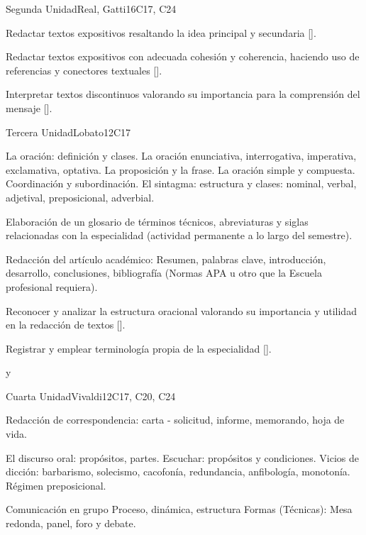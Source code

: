 \begin{syllabus}
\begin{unit}{}{Segunda Unidad}{Real, Gatti}{16}{C17, C24}
\begin{learningoutcomes}
   \item Redactar textos expositivos resaltando la idea principal y secundaria [\Usage].
   \item Redactar textos expositivos con adecuada cohesión y coherencia, haciendo uso de referencias y conectores textuales [\Usage].
   \item Interpretar textos discontinuos  valorando su importancia para la comprensión del mensaje [\Usage].
\end{learningoutcomes}
\end{unit}

\begin{unit}{}{Tercera Unidad}{Lobato}{12}{C17}
\begin{topics}
   \item La oración: definición y clases. La oración enunciativa, interrogativa, imperativa, exclamativa, optativa. La proposición y la frase. La oración simple y compuesta. Coordinación y subordinación. El sintagma: estructura y clases: nominal, verbal, adjetival, preposicional, adverbial.
   \item Elaboración de un glosario de términos técnicos, abreviaturas y siglas relacionadas con la especialidad (actividad permanente a lo largo del semestre).
   \item Redacción del artículo académico: Resumen, palabras clave, introducción, desarrollo, conclusiones, bibliografía (Normas APA u otro que la Escuela profesional requiera).
\end{topics}
\begin{learningoutcomes}
   \item Reconocer y analizar  la estructura oracional valorando su importancia y utilidad en la redacción de textos [\Usage].
   \item Registrar y emplear terminología propia de la especialidad [\Usage].
\end{learningoutcomes}
\end{unit}
y
\begin{unit}{}{Cuarta Unidad}{Vivaldi}{12}{C17, C20, C24}
\begin{topics}
   \item Redacción de correspondencia: carta - solicitud, informe, memorando, hoja de vida.
   \item El discurso oral: propósitos, partes. Escuchar: propósitos y condiciones. Vicios de dicción: barbarismo, solecismo, cacofonía, redundancia, anfibología, monotonía. Régimen preposicional.
   \item Comunicación en grupo Proceso, dinámica, estructura Formas (Técnicas): Mesa redonda,  panel, foro y debate.

\end{topics}
\end{unit}
\end{syllabus}
